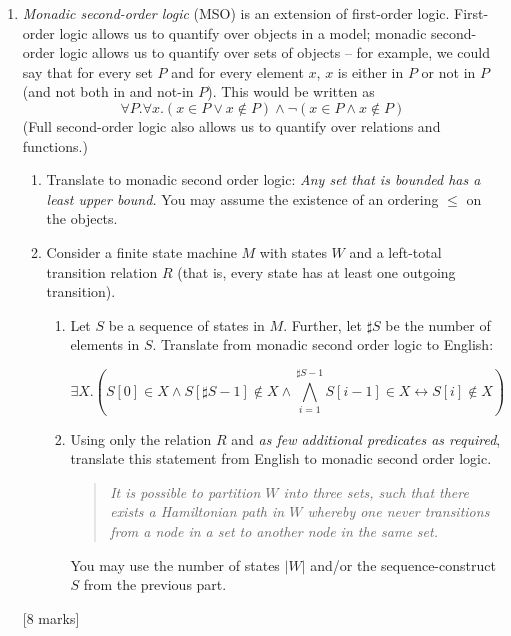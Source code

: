 \documentclass[12pt, a4paper]{article}
\begin{document}
\begin{enumerate}
\begin{enumerate}
\end{enumerate}

[12 marks]

\item \textit{Monadic second-order logic} (MSO) is an extension of first-order logic. First-order logic allows us to quantify over objects in a model; monadic second-order logic allows us to quantify over sets of objects -- for example, we could say that for every set $P$ and for every element $x$, $x$ is either in $P$ or not in $P$ (and not both in and not-in $P$). This would be written as 
$$
\forall P. \forall x.  (x \in P \vee x \notin P) \wedge \neg (x \in P \wedge x \notin P)
$$
(Full second-order logic also allows us to quantify over relations and functions.)

\begin{enumerate}
\item Translate to monadic second order logic: \textit{Any set that is bounded has a least upper bound.} You may assume the existence of an ordering $\leq$ on the objects. %

\item Consider a finite state machine $M$ with states $W$ and a left-total transition relation $R$ (that is, every state has at least one outgoing transition). 

\begin{enumerate}
\item Let $S$ be a sequence of states in $M$. Further, let $\sharp S$ be the number of elements in $S$. Translate from monadic second order logic to English:

$$
\exists X. \left( S[0] \in X \wedge S[\sharp S - 1] \notin X \wedge \bigwedge_{i=1}^{\sharp S - 1} S[i - 1] \in X \leftrightarrow S[i] \notin X \right)
$$

\item Using only the relation $R$ and \textit{as few additional predicates as required}, translate this statement from English to monadic second order logic.
\begin{quote}
\textit{
It is possible to partition $W$ into three sets, such that there exists a Hamiltonian path in $W$ whereby one never transitions from a node in a set to another node in the same set.
}
\end{quote}
You may use the number of states $|W|$ and/or the sequence-construct $S$ from the previous part.
\end{enumerate}

\end{enumerate}

[8 marks]

\end{enumerate}
\end{document}
